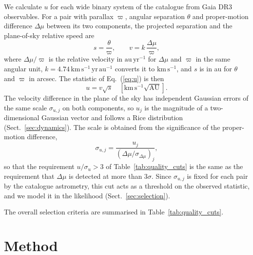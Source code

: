 \documentclass{aa}
\newcommand{\kmsau}{\mathrm{km}\,\mathrm{s}^{-1}\sqrt{\mathrm{AU}}}
\begin{document}
We calculate $u$ for each wide binary system of the \citet{ElBadry2021MillionBinaries} catalogue from Gaia DR3 observables. For a pair with parallax $\varpi$, angular separation $\theta$ and proper-motion difference $\Delta\mu$ between its two components, the projected separation and the plane-of-sky relative speed are
\begin{equation}
 s=\frac{\theta}{\varpi},\qquad v=k\,\frac{\Delta\mu}{\varpi},
 \label{eq:sv}
\end{equation}
where $\Delta\mu/\varpi$ is the relative velocity in $\mathrm{au\,yr^{-1}}$ for $\Delta\mu$ and $\varpi$ in the same angular unit, $k=4.74\,\mathrm{km\,s^{-1}}\,\mathrm{yr\,au^{-1}}$ converts it to $\mathrm{km\,s^{-1}}$, and $s$ is in au for $\theta$ and $\varpi$ in arcsec. The statistic of Eq.~(\ref{eq:u}) is then
\begin{equation}
 u=v\sqrt{s}\quad[\kmsau].
 \label{eq:uobs}
\end{equation}
The velocity difference in the plane of the sky has independent Gaussian errors of the same scale $\sigma_{u,j}$ on both components, so $u_j$ is the magnitude of a two-dimensional Gaussian vector and follows a Rice distribution (Sect.~\ref{sec:dynamics}). The scale is obtained from the significance of the proper-motion difference,
\begin{equation}
 \sigma_{u,j}=\frac{u_j}{(\Delta\mu/\sigma_{\Delta\mu})_j},
 \label{eq:sigu}
\end{equation}
so that the requirement $u/\sigma_u>3$ of Table~\ref{tab:quality_cuts} is the same as the requirement that $\Delta\mu$ is detected at more than $3\sigma$. Since $\sigma_{u,j}$ is fixed for each pair by the catalogue astrometry, this cut acts as a threshold on the observed statistic, and we model it in the likelihood (Sect.~\ref{sec:selection}).

The overall selection criteria are summarised in Table~\ref{tab:quality_cuts}.

\section{Method}\label{sec:method}
\end{document}

